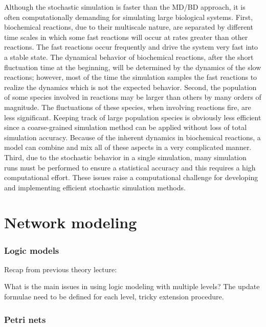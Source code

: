 Although the stochastic simulation is faster than the MD/BD approach, it
is often computationally demanding for simulating large biological
systems. First, biochemical reactions, due to their multiscale nature,
are separated by different time scales in which some fast reactions will
occur at rates greater than other reactions. The fast reactions occur
frequently and drive the system very fast into a stable state. The
dynamical behavior of biochemical reactions, after the short fluctuation
time at the beginning, will be determined by the dynamics of the slow
reactions; however, most of the time the simulation samples the fast
reactions to realize the dynamics which is not the expected behavior.
Second, the population of some species involved in reactions may be
larger than others by many orders of magnitude. The fluctuations of
these species, when involving reactions fire, are less significant.
Keeping track of large population species is obviously less efficient
since a coarse-grained simulation method can be applied without loss of
total simulation accuracy. Because of the inherent dynamics in
biochemical reactions, a model can combine and mix all of these aspects
in a very complicated manner. Third, due to the stochastic behavior in a
single simulation, many simulation runs must be performed to ensure a
statistical accuracy and this requires a high computational effort.
These issues raise a computational challenge for developing and
implementing efficient stochastic simulation methods.

\hypertarget{network-modeling}{%
\section{Network modeling}\label{network-modeling}}

\hypertarget{logic-models}{%
\subsubsection{Logic models}\label{logic-models}}

Recap from previous theory lecture:

What is the main issues in using logic modeling with multiple levels?
The update formulae need to be defined for each level, tricky extension
procedure.

\hypertarget{petri-nets}{%
\subsubsection{Petri nets}\label{petri-nets}}


